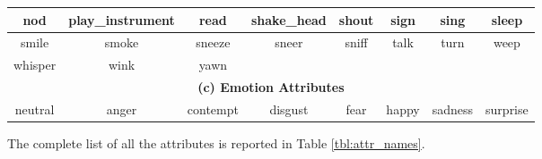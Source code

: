 \documentclass[runningheads]{llncs}
\begin{document}
\begin{table*}[t]
{\begin{tabular}{cccccccc}
\multicolumn{1}{c|}{nod}                                                   & \multicolumn{1}{c|}{play\_instrument}                                          & \multicolumn{1}{c|}{read}                                                       & \multicolumn{1}{c|}{shake\_head}                                                 & \multicolumn{1}{c|}{shout}                                                      & \multicolumn{1}{c|}{sign}                                                         & \multicolumn{1}{c|}{sing}                                                      & sleep                                                       \\ \hline
\multicolumn{1}{c|}{smile}                                                 & \multicolumn{1}{c|}{smoke}                                                     & \multicolumn{1}{c|}{sneeze}                                                     & \multicolumn{1}{c|}{sneer}                                                       & \multicolumn{1}{c|}{sniff}                                                      & \multicolumn{1}{c|}{talk}                                                         & \multicolumn{1}{c|}{turn}                                                      & weep                                                        \\ \hline
\multicolumn{1}{c|}{whisper}                                               & \multicolumn{1}{c|}{wink}                                                      & \multicolumn{1}{c|}{yawn}                                                       & \multicolumn{1}{c|}{}                                                            & \multicolumn{1}{c|}{}                                                           & \multicolumn{1}{c|}{}                                                             & \multicolumn{1}{c|}{}                                                          &                                                             \\ \hline
\multicolumn{8}{c}{\textbf{(c) Emotion Attributes}} \\ \hline
\multicolumn{1}{c|}{neutral}                                               & \multicolumn{1}{c|}{anger}                                                     & \multicolumn{1}{c|}{contempt}                                                   & \multicolumn{1}{c|}{disgust}                                                     & \multicolumn{1}{c|}{fear}                                                       & \multicolumn{1}{c|}{happy}                                                        & \multicolumn{1}{c|}{sadness}                                                   & surprise                                                    \\ \hline
\end{tabular}}
\label{tbl:attr_names}
\end{table*}

\iffalse
\begin{figure*}[t]
\centering
\texttt{[image: images/attr\_list\_appear.pdf]}
\caption{\textbf{Examples of appearance attributes.}}
\label{fig:appear}
\vspace{-4mm}
\end{figure*}
\fi


The complete list of all the attributes is reported in Table \ref{tbl:attr_names}. 
\end{document}
